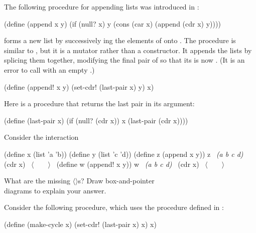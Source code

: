 \begin{exerciseGroup}
\label{Exercise 3.12}
 The following procedure for
appending lists was introduced in :

\begin{codeBlock}
(define (append x y)
  (if (null? x)
      y
      (cons (car x) (append (cdr x) y))))
\end{codeBlock}

 forms a new list by successively ing the elements of
 onto .  The procedure  is similar to
, but it is a mutator rather than a constructor.  It appends the
lists by splicing them together, modifying the final pair of  so that
its  is now .  (It is an error to call  with an
empty .)

\begin{codeBlock}
(define (append! x y)
  (set-cdr! (last-pair x) y)
  x)
\end{codeBlock}

Here  is a procedure that returns the last pair in its
argument:

\begin{codeBlock}
(define (last-pair x)
  (if (null? (cdr x)) x (last-pair (cdr x))))
\end{codeBlock}

Consider the interaction

\begin{codeBlock}
(define x (list 'a 'b))
(define y (list 'c 'd))
(define z (append x y))
z
~\textit{(a b c d)}~
(cdr x)
~\(\langle \)~~~~\(\rangle \)~
(define w (append! x y))
w
~\textit{(a b c d)}~
(cdr x)
~\(\langle \)~~~~\(\rangle \)~
\end{codeBlock}

What are the missing \( \langle \)\( \rangle \)s?
Draw box-and-pointer \\ diagrams to explain your answer.

\label{Exercise 3.13}
 Consider the following
 procedure, which uses the  procedure defined
in :

\begin{codeBlock}
(define (make-cycle x)
  (set-cdr! (last-pair x) x)
  x)
\end{codeBlock}


\end{exerciseGroup}
